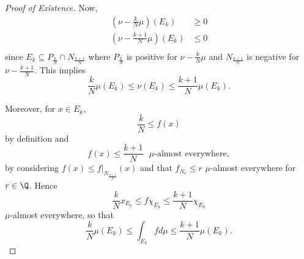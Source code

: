 \documentclass[pmath451]{subfiles}
\begin{document}
\begin{proof}[Proof of Existence]
        Now,
        \begin{equation*}
            \begin{aligned}
                \left( \nu-\frac{k}{N}\mu \right)\left( E_k \right) & \geq 0 \\
                \left( \nu-\frac{k+1}{N}\mu \right)\left( E_k \right) & \leq 0 \\
            \end{aligned} 
        \end{equation*}
        since $E_k \subseteq P_{\frac{k}{N}}\cap N_{\frac{k+1}{N}}$ where $P_{\frac{k}{N}}$ is positive for $\nu-\frac{k}{N}\mu$ and $N_{\frac{k+1}{N}}$ is negative for $\nu-\frac{k+1}{N}$. This implies
        \begin{equation}
            \frac{k}{N} \mu\left( E_k \right) \leq \nu\left( E_k \right) \leq \frac{k+1}{N} \mu\left( E_k \right).
        \end{equation}

        Moreover, for $x\in E_k$,
        \begin{equation*}
            \frac{k}{N} \leq f\left( x \right)
        \end{equation*}
        by definition and
        \begin{equation*}
            f\left( x \right) \leq \frac{k+1}{N} \text{ $\mu$-almost everywhere},
        \end{equation*}
        by considering $f\left( x \right)\leq f|_{N_{\frac{k+1}{N}}}\left( x \right)$ and that $f_{N_r}\leq r$ $\mu$-almost everywhere for $r\in\Q$. Hence
        \begin{equation*}
            \frac{k}{N} x_{E_k}\leq f\chi_{E_k} \leq \frac{k+1}{N}\chi_{E_k}
        \end{equation*}
        $\mu$-almost everywhere, so that
        \begin{equation}
            \frac{k}{N}\mu\left( E_k \right)\leq\int_{E_k}fd\mu \leq \frac{k+1}{N}\mu\left( E_k \right).
        \end{equation}


\end{proof}
\end{document}
